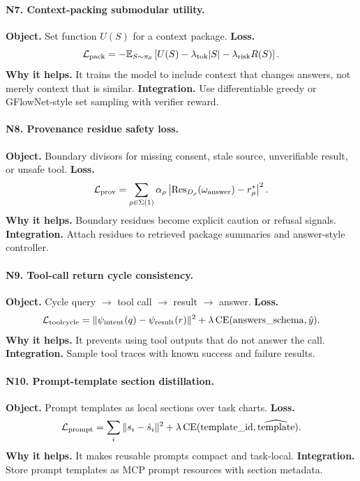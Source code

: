 \documentclass[11pt]{article}
\newcommand{\loss}{\mathcal{L}}
\numberwithin{equation}{section}
\begin{document}
\paragraph{N7. Context-packing submodular utility.}
\textbf{Object.} Set function $U(S)$ for a context package. \textbf{Loss.}
\begin{equation}
\loss_{\rm pack}= -\mathbb E_{S\sim\pi_\theta}\left[U(S)-\lambda_{\rm tok}|S|-\lambda_{\rm risk}R(S)\right].
\end{equation}
\textbf{Why it helps.} It trains the model to include context that changes answers, not merely context that is similar. \textbf{Integration.} Use differentiable greedy or GFlowNet-style set sampling with verifier reward.

\paragraph{N8. Provenance residue safety loss.}
\textbf{Object.} Boundary divisors for missing consent, stale source, unverifiable result, or unsafe tool. \textbf{Loss.}
\begin{equation}
\loss_{\rm prov}=\sum_{\rho\in\Sigma(1)}\alpha_\rho\left|\operatorname{Res}_{D_\rho}(\omega_{\rm answer})-r_\rho^*\right|^2.
\end{equation}
\textbf{Why it helps.} Boundary residues become explicit caution or refusal signals. \textbf{Integration.} Attach residues to retrieved package summaries and answer-style controller.

\paragraph{N9. Tool-call return cycle consistency.}
\textbf{Object.} Cycle query $\to$ tool call $\to$ result $\to$ answer. \textbf{Loss.}
\begin{equation}
\loss_{\rm toolcycle}=\|\psi_{\rm intent}(q)-\psi_{\rm result}(r)\|^2+\lambda\operatorname{CE}(\mathrm{answers\_schema},\hat y).
\end{equation}
\textbf{Why it helps.} It prevents using tool outputs that do not answer the call. \textbf{Integration.} Sample tool traces with known success and failure results.

\paragraph{N10. Prompt-template section distillation.}
\textbf{Object.} Prompt templates as local sections over task charts. \textbf{Loss.}
\begin{equation}
\loss_{\rm prompt}=\sum_i\|s_i-\hat s_i\|^2+\lambda\operatorname{CE}(\mathrm{template\_id},\widehat{\mathrm{template}}).
\end{equation}
\textbf{Why it helps.} It makes reusable prompts compact and task-local. \textbf{Integration.} Store prompt templates as MCP prompt resources with section metadata.
\end{document}

